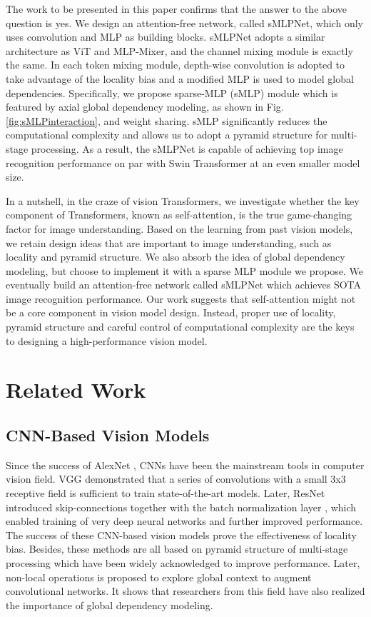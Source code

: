 \documentclass[letterpaper]{article} \usepackage{aaai22}  \usepackage{times}  \usepackage{helvet}  \usepackage{courier}  \usepackage[hyphens]{url}  \usepackage{graphicx} \usepackage{color}
\begin{document}
The work to be presented in this paper confirms that the answer to the above question is yes. We design an attention-free network, called sMLPNet, which only uses convolution and MLP as building blocks. sMLPNet adopts a similar architecture as ViT and MLP-Mixer, and the channel mixing module is exactly the same. In each token mixing module, depth-wise convolution is adopted to take advantage of the locality bias and a modified MLP is used to model global dependencies. Specifically, we propose sparse-MLP (sMLP) module which is featured by axial global dependency modeling, as shown in Fig.\ref{fig:sMLPinteraction}, and weight sharing. sMLP significantly reduces the computational complexity and allows us to adopt a pyramid structure for multi-stage processing. As a result, the sMLPNet is capable of achieving top image recognition performance on par with Swin Transformer at an even smaller model size. 

In a nutshell, in the craze of vision Transformers, we investigate whether the key component of Transformers, known as self-attention, is the true game-changing factor for image understanding. Based on the learning from past vision models, we retain design ideas that are important to image understanding, such as locality and pyramid structure. We also absorb the idea of global dependency modeling, but choose to implement it with a sparse MLP module we propose. We eventually build an attention-free network called sMLPNet which achieves SOTA image recognition performance. Our work suggests that self-attention might not be a core component in vision model design. Instead, proper use of locality, pyramid structure and careful control of computational complexity are the keys to designing a high-performance vision model.










\section{Related Work}
\subsection{CNN-Based Vision Models}
Since the success of AlexNet \cite{krizhevsky2012imagenet},
CNNs have been the mainstream tools in computer vision field. VGG \cite{simonyan2014very} demonstrated that a series of convolutions with a small 3x3 receptive field is sufficient to train state-of-the-art models. Later, ResNet \cite{he2016deep} introduced skip-connections together with the batch normalization layer \cite{ioffe2015batch}, which enabled training of very deep neural networks and further improved performance. The success of these CNN-based vision models prove the effectiveness of locality bias. Besides, these methods are all based on pyramid structure of multi-stage processing which have been widely acknowledged to improve performance. 
Later, non-local operations \cite{wang2018non} is proposed to explore global context to augment convolutional networks. It shows that researchers from this field have also realized the importance of global dependency modeling.
\end{document}

